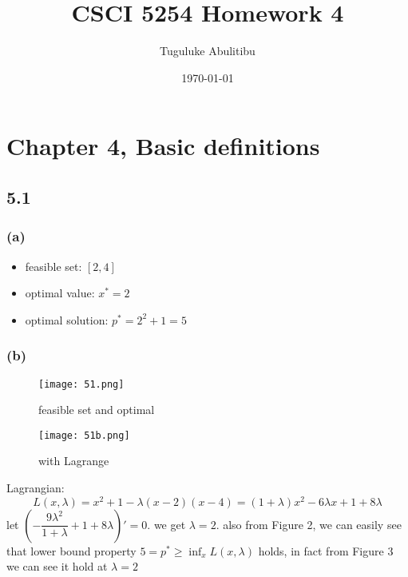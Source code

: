 \documentclass{article}
\title{CSCI 5254  Homework 4}
\author{Tuguluke Abulitibu}
\date\today
\begin{document}
\maketitle %
\section*{Chapter 4, Basic definitions}	
\subsection*{5.1}



\subsubsection*{(a)}
\begin{itemize}
\item feasible set: $[2,4]$
\item optimal value: $x^* = 2$
\item optimal solution: $p^* = 2^2 + 1  = 5$
\end{itemize}

\subsubsection*{(b)}
    \begin{figure}[h]
\centering
\begin{minipage}{.5\textwidth}
  \centering
  \texttt{[image: 51.png]}
  \caption{feasible set and optimal}

\end{minipage}%
\begin{minipage}{.5\textwidth}
  \centering
  \texttt{[image: 51b.png]}
  \caption{with Lagrange}

\end{minipage}

\end{figure}
Lagrangian:
\[L (x, \lambda) = x^2 + 1 - \lambda(x-2)(x-4) = (1+ \lambda) x^2 -6\lambda x + 1 + 8\lambda\]
let $(-\dfrac{9\lambda^2}{1+ \lambda} + 1 + 8\lambda)' = 0$. we get $\lambda = 2$. also from Figure 2, we can easily see that lower bound property $5 = p^* \ge \inf_x L(x, \lambda)$ holds, in fact from Figure 3 we can see it hold at $\lambda =2$\\
\end{document}
